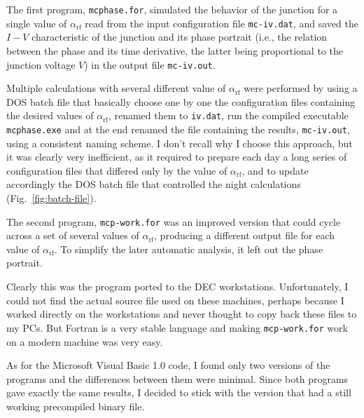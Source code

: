 The first program, \texttt{mcphase.for}, simulated the behavior of the junction for a single value of $\alpha_\mathrm{rf}$ read from the input configuration file \texttt{mc-iv.dat}, and saved the $I - V$ characteristic of the junction and its phase portrait (i.e., the relation between the phase and its time derivative, the latter being proportional to the junction voltage $V$) in the output file \texttt{mc-iv.out}.

Multiple calculations with several different value of $\alpha_\mathrm{rf}$ were performed by using a  DOS batch file that basically choose one by one the configuration files containing the desired values of $\alpha_\mathrm{rf}$, renamed them to \texttt{iv.dat}, run the compiled executable \texttt{mcphase.exe} and at the end renamed the file containing the results, \texttt{mc-iv.out}, using a consistent naming scheme.
I don't recall why I choose this approach, but it was clearly very inefficient, as it required to prepare each day a long series of configuration files that differed only by the value of $\alpha_\mathrm{rf}$, and to update accordingly the DOS batch file that controlled the night calculations (Fig.~\ref{fig:batch-file}).

The second program, \texttt{mcp-work.for} was an improved version that could cycle across a  set of several values of $\alpha_\mathrm{rf}$, producing a different output file for each value of $\alpha_\mathrm{rf}$. To simplify the later automatic analysis, it left out the phase portrait.

Clearly this was the program ported to the DEC workstations. 
Unfortunately, I could not find the actual source file used on these machines, perhaps because I worked directly on the workstations and never thought to copy back these files to my PCs.
But Fortran is a very stable language and making \texttt{mcp-work.for} work on a modern machine was very easy.

As for the Microsoft Visual Basic 1.0 code, I found only two versions of the programs and the differences between them were minimal. Since both programs gave exactly the same results, I decided to stick with the version that had a still working precompiled binary file.



